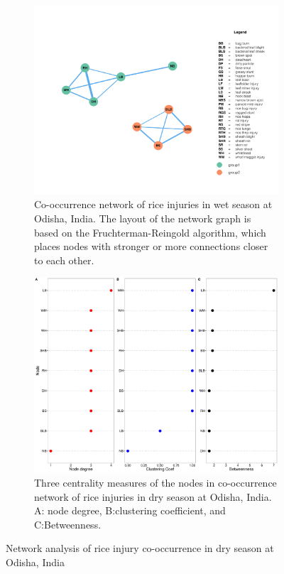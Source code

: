 \begin{figure}
    \centering
    \begin{subfigure}[b]{1\textwidth}
        \includegraphics[width = 1\textwidth]{figures/networkOR_ds/networkOR_ds.pdf}
        \caption{Co-occurrence network of rice injuries in wet season at Odisha, India. The layout of the network graph is based on the Fruchterman-Reingold algorithm, which places nodes with stronger or more connections closer to each other.}
        \label{fig:networkOR_ds}
    \end{subfigure}
    \begin{subfigure}[b]{1\textwidth}
        \includegraphics[width = 1\textwidth]{figures/nodepropOR_ds/nodepropOR_ds.pdf}
        \caption{Three centrality measures of the nodes in co-occurrence network of rice injuries in dry season at Odisha, India. A: node degree, B:clustering coefficient, and C:Betweenness.}
        \label{fig:nodepropOR_ds}
    \end{subfigure}
    \caption{Network analysis of rice injury co-occurrence in dry season at Odisha, India}
    \label{fig:OR_ds}
\end{figure}

